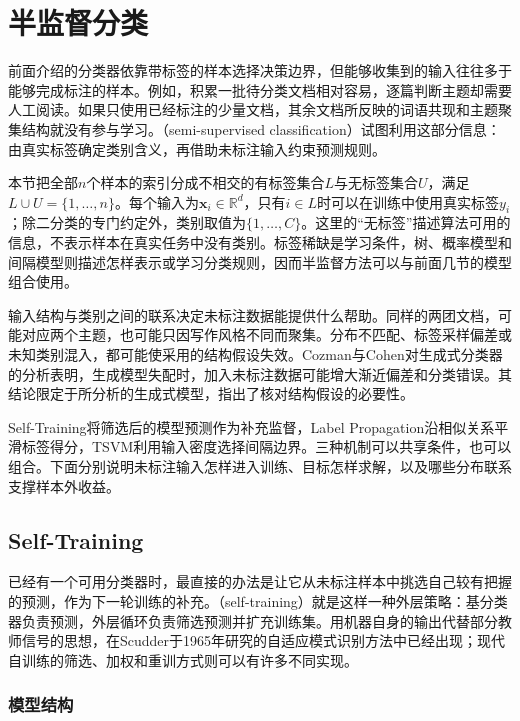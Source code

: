 \section{半监督分类}
\label{sec:classification-semisupervised}

前面介绍的分类器依靠带标签的样本选择决策边界，但能够收集到的输入往往多于能够完成标注的样本。例如，积累一批待分类文档相对容易，逐篇判断主题却需要人工阅读。如果只使用已经标注的少量文档，其余文档所反映的词语共现和主题聚集结构就没有参与学习。（semi-supervised classification）试图利用这部分信息：由真实标签确定类别含义，再借助未标注输入约束预测规则。

本节把全部$n$个样本的索引分成不相交的有标签集合$L$与无标签集合$U$，满足$L\cup U=\{1,\dots,n\}$。每个输入为$\bm{x}_i\in\mathbb{R}^{d}$，只有$i\in L$时可以在训练中使用真实标签$y_i$；除二分类的专门约定外，类别取值为$\{1,\dots,C\}$。这里的“无标签”描述算法可用的信息，不表示样本在真实任务中没有类别。标签稀缺是学习条件，树、概率模型和间隔模型则描述怎样表示或学习分类规则，因而半监督方法可以与前面几节的模型组合使用。

输入结构与类别之间的联系决定未标注数据能提供什么帮助。同样的两团文档，可能对应两个主题，也可能只因写作风格不同而聚集。分布不匹配、标签采样偏差或未知类别混入，都可能使采用的结构假设失效。Cozman与Cohen对生成式分类器的分析表明，生成模型失配时，加入未标注数据可能增大渐近偏差和分类错误。其结论限定于所分析的生成式模型，指出了核对结构假设的必要性。

Self-Training将筛选后的模型预测作为补充监督，Label Propagation沿相似关系平滑标签得分，TSVM利用输入密度选择间隔边界。三种机制可以共享条件，也可以组合。下面分别说明未标注输入怎样进入训练、目标怎样求解，以及哪些分布联系支撑样本外收益。

\subsection{Self-Training}
\label{sec:classification-self-training}

已经有一个可用分类器时，最直接的办法是让它从未标注样本中挑选自己较有把握的预测，作为下一轮训练的补充。（self-training）就是这样一种外层策略：基分类器负责预测，外层循环负责筛选预测并扩充训练集。用机器自身的输出代替部分教师信号的思想，在Scudder于1965年研究的自适应模式识别方法中已经出现；现代自训练的筛选、加权和重训方式则可以有许多不同实现。

\subsubsection{模型结构}
\label{sec:classification-self-training-structure}

